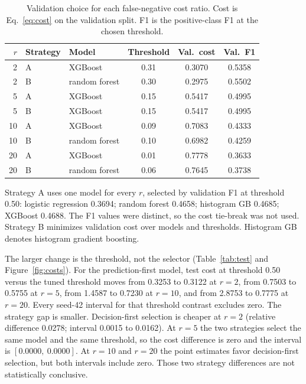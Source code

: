 \documentclass[12pt]{article}
\begin{document}
\begin{table}[htbp]
\centering
\begin{singlespace}
\caption{Validation choice for each false-negative cost ratio. Cost is Eq.~\eqref{eq:cost} on the validation split. F1 is the positive-class F1 at the chosen threshold.}
\label{tab:validation}
\footnotesize
\begin{tabular}{@{}r l l c c c@{}}
\toprule
\(r\) & Strategy & Model & Threshold & Val.\ cost & Val.\ F1 \\
\midrule
2 & A & XGBoost & 0.31 & 0.3070 & 0.5358 \\
2 & B & random forest & 0.30 & 0.2975 & 0.5502 \\
5 & A & XGBoost & 0.15 & 0.5417 & 0.4995 \\
5 & B & XGBoost & 0.15 & 0.5417 & 0.4995 \\
10 & A & XGBoost & 0.09 & 0.7083 & 0.4333 \\
10 & B & random forest & 0.10 & 0.6982 & 0.4259 \\
20 & A & XGBoost & 0.01 & 0.7778 & 0.3633 \\
20 & B & random forest & 0.06 & 0.7645 & 0.3738 \\
\bottomrule
\end{tabular}
\par\vspace{0.35em}
\parbox{\linewidth}{\footnotesize Strategy A uses one model for every \(r\), selected by validation F1 at threshold 0.50: logistic regression 0.3694; random forest 0.4658; histogram GB 0.4685; XGBoost 0.4688. The F1 values were distinct, so the cost tie-break was not used. Strategy B minimizes validation cost over models and thresholds. Histogram GB denotes histogram gradient boosting.}
\end{singlespace}
\end{table}

The larger change is the threshold, not the selector (Table~\ref{tab:test} and Figure~\ref{fig:costs}). For the prediction-first model, test cost at threshold 0.50 versus the tuned threshold moves from 0.3253 to 0.3122 at \(r=2\), from 0.7503 to 0.5755 at \(r=5\), from 1.4587 to 0.7230 at \(r=10\), and from 2.8753 to 0.7775 at \(r=20\). Every seed-42 interval for that threshold contrast excludes zero. The strategy gap is smaller. Decision-first selection is cheaper at \(r=2\) (relative difference 0.0278; interval 0.0015 to 0.0162). At \(r=5\) the two strategies select the same model and the same threshold, so the cost difference is zero and the interval is \([0.0000,\ 0.0000]\). At \(r=10\) and \(r=20\) the point estimates favor decision-first selection, but both intervals include zero. Those two strategy differences are not statistically conclusive.
\end{document}
